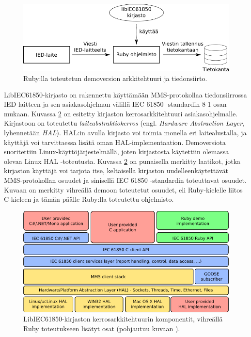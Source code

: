 \begin{figure}[ht!]
	\includegraphics[width=1\textwidth]{pictures/demo-architecture.png}
	\caption{Ruby:lla toteutetun demoversion arkkitehtuuri ja tiedonsiirto.}
	\label{fig:demo-architecture}
\end{figure}

LibIEC61850-kirjasto on rakennettu käyttämään MMS-protokollaa tiedonsiirrossa IED-laitteen ja sen asiakasohjelman välillä IEC 61850 -standardin 8-1 osan mukaan. Kuvassa \ref{fig:libiec61850-layer-architecture} on esitetty kirjaston kerrosarkkitehtuuri asiakasohjelmalle. Kirjastoon on toteutettu \emph{laiteabstraktiokerros} (engl. \emph{Hardware Abstraction Layer}, lyhennetään \emph{HAL}). HAL:in avulla kirjasto voi toimia monella eri laitealustalla, ja käyttäjä voi tarvittaessa lisätä oman HAL-implementaation. Demoversiota suoritettiin Linux-käyttöjärjestelmällä, joten kirjastosta käytettiin olemassa olevaa Linux HAL -toteutusta. Kuvassa \ref{fig:libiec61850-layer-architecture} on punaisella merkitty laatikot, jotka kirjaston käyttäjä voi tarjota itse, keltaisella kirjaston uudelleenkäytettävät MMS-protokollan osuudet ja sinisellä IEC 61850 -standardin toteuttavat osuudet. Kuvaan on merkitty vihreällä demoon toteutetut osuudet, eli Ruby-kielelle liitos C-kieleen ja tämän päälle Ruby:lla toteutettu ohjelmisto.

\begin{figure}[ht!]
	\includegraphics[width=1\textwidth]{pictures/libiec61850-layer-architecture.png}
	\caption{LibIEC61850-kirjaston kerrosarkkitehtuurin komponentit, vihreällä Ruby toteutukseen lisätyt osat (pohjautuu kuvaan \mbox{\cite{libIEC61850-api-overview}}).}
	\label{fig:libiec61850-layer-architecture}
\end{figure}

